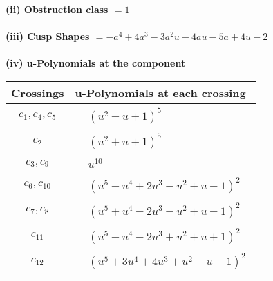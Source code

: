 \documentclass[1p]{elsarticle_modified}
\theoremstyle{definition}
\begin{document}
\flushleft \textbf{(ii) Obstruction class $= 1$}\\~\\
\flushleft \textbf{(iii) Cusp Shapes $= - a^4+4 a^3-3 a^2 u-4 a u-5 a+4 u-2$}\\~\\
\newpage\renewcommand{\arraystretch}{1}
\flushleft \textbf{(iv) u-Polynomials at the component}\newline \\
\begin{tabular}{m{50pt}|m{274pt}}
Crossings & \hspace{64pt}u-Polynomials at each crossing \\
\hline $$\begin{aligned}c_{1},c_{4},c_{5}\end{aligned}$$&$\begin{aligned}
&(u^2- u+1)^5
\end{aligned}$\\
\hline $$\begin{aligned}c_{2}\end{aligned}$$&$\begin{aligned}
&(u^2+u+1)^5
\end{aligned}$\\
\hline $$\begin{aligned}c_{3},c_{9}\end{aligned}$$&$\begin{aligned}
&u^{10}
\end{aligned}$\\
\hline $$\begin{aligned}c_{6},c_{10}\end{aligned}$$&$\begin{aligned}
&(u^5- u^4+2 u^3- u^2+u-1)^2
\end{aligned}$\\
\hline $$\begin{aligned}c_{7},c_{8}\end{aligned}$$&$\begin{aligned}
&(u^5+u^4-2 u^3- u^2+u-1)^2
\end{aligned}$\\
\hline $$\begin{aligned}c_{11}\end{aligned}$$&$\begin{aligned}
&(u^5- u^4-2 u^3+u^2+u+1)^2
\end{aligned}$\\
\hline $$\begin{aligned}c_{12}\end{aligned}$$&$\begin{aligned}
&(u^5+3 u^4+4 u^3+u^2- u-1)^2
\end{aligned}$\\
\hline
\end{tabular}\\~\\
\end{document}
